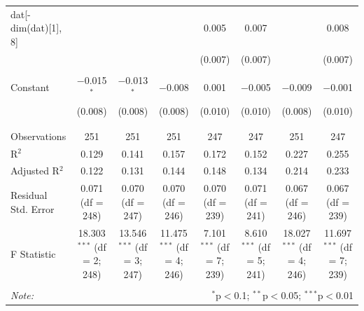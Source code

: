 \begin{table}[!htbp]
\begin{tabular}{@{\extracolsep{5pt}}lccccccc}
 dat[-dim(dat)[1], 8] &  &  &  & 0.005 & 0.007 &  & 0.008 \\ 
  &  &  &  & (0.007) & (0.007) &  & (0.007) \\ 
  & & & & & & & \\ 
 Constant & $-$0.015$^{*}$ & $-$0.013$^{*}$ & $-$0.008 & 0.001 & $-$0.005 & $-$0.009 & $-$0.001 \\ 
  & (0.008) & (0.008) & (0.008) & (0.010) & (0.010) & (0.008) & (0.010) \\ 
  & & & & & & & \\ 
\hline \\[-1.8ex] 
Observations & 251 & 251 & 251 & 247 & 247 & 251 & 247 \\ 
R$^{2}$ & 0.129 & 0.141 & 0.157 & 0.172 & 0.152 & 0.227 & 0.255 \\ 
Adjusted R$^{2}$ & 0.122 & 0.131 & 0.144 & 0.148 & 0.134 & 0.214 & 0.233 \\ 
Residual Std. Error & 0.071 (df = 248) & 0.070 (df = 247) & 0.070 (df = 246) & 0.070 (df = 239) & 0.071 (df = 241) & 0.067 (df = 246) & 0.067 (df = 239) \\ 
F Statistic & 18.303$^{***}$ (df = 2; 248) & 13.546$^{***}$ (df = 3; 247) & 11.475$^{***}$ (df = 4; 246) & 7.101$^{***}$ (df = 7; 239) & 8.610$^{***}$ (df = 5; 241) & 18.027$^{***}$ (df = 4; 246) & 11.697$^{***}$ (df = 7; 239) \\ 
\hline 
\hline \\[-1.8ex] 
\textit{Note:}  & \multicolumn{7}{r}{$^{*}$p$<$0.1; $^{**}$p$<$0.05; $^{***}$p$<$0.01} \\ 
\end{tabular} 
\end{table} 
